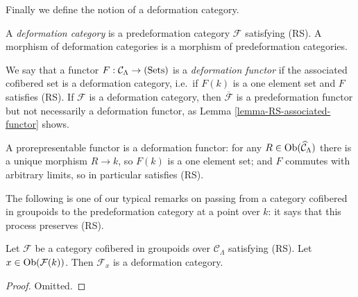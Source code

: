 \noindent
Finally we define the notion of a deformation category.
\begin{definition}
A \emph{deformation category} is a predeformation category $\mathcal F$ 
satisfying (RS).  A morphism of deformation categories is a morphism of 
predeformation categories.
\end{definition}

\begin{remark}
We say that a functor $F: \mathcal C_{\Lambda} \rightarrow \textnormal{(Sets)}$ 
is a \emph{deformation functor} if the associated cofibered set is a 
deformation category, i.e.\ if $F(k)$ is a one element set and $F$ satisfies 
(RS).  If $\mathcal F$ is a deformation category, then $\overline{\mathcal F}$ 
is a predeformation functor but not necessarily a deformation functor, as Lemma 
\ref{lemma-RS-associated-functor} shows.
\end{remark}

\begin{example}
\label{example-prorepresentable-deformation-functor}
A prorepresentable functor is a deformation functor: for any $R \in 
\textnormal{Ob}(\widehat{\mathcal C}_{\Lambda})$ there is a unique morphism $R 
\rightarrow k$, so $F(k)$ is a one element set; and $F$ commutes with arbitrary 
limits, so in particular satisfies (RS).
\end{example}

\noindent
The following is one of our typical remarks on passing from a category 
cofibered in groupoids to the predeformation category at a point over $k$: it 
says that this process preserves (RS).
\begin{lemma}
\label{lemma-localize-RS}
Let $\mathcal F$ be a category cofibered in groupoids over $\mathcal 
C_{\Lambda}$ satisfying \textnormal{(RS)}. Let $x \in \textnormal{Ob}(\mathcal 
F(k))$.  Then $\mathcal F_{x}$ is a deformation category.
\end{lemma}

\begin{proof}
Omitted.
\end{proof}

